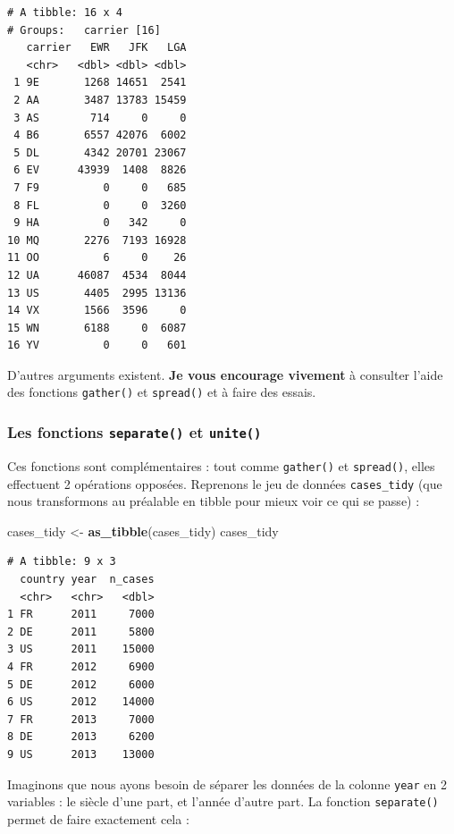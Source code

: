\documentclass[a4paperpaper,]{article}
\newenvironment{Shaded}{\begin{snugshade}}{\end{snugshade}}
\newcommand{\KeywordTok}[1]{\textcolor[rgb]{0.13,0.29,0.53}{\textbf{#1}}}
\newcommand{\StringTok}[1]{\textcolor[rgb]{0.31,0.60,0.02}{#1}}
\newcommand{\NormalTok}[1]{#1}
\theoremstyle{definition}
\theoremstyle{definition}
\theoremstyle{definition}
\theoremstyle{remark}
\begin{document}
\begin{verbatim}
# A tibble: 16 x 4
# Groups:   carrier [16]
   carrier   EWR   JFK   LGA
   <chr>   <dbl> <dbl> <dbl>
 1 9E       1268 14651  2541
 2 AA       3487 13783 15459
 3 AS        714     0     0
 4 B6       6557 42076  6002
 5 DL       4342 20701 23067
 6 EV      43939  1408  8826
 7 F9          0     0   685
 8 FL          0     0  3260
 9 HA          0   342     0
10 MQ       2276  7193 16928
11 OO          6     0    26
12 UA      46087  4534  8044
13 US       4405  2995 13136
14 VX       1566  3596     0
15 WN       6188     0  6087
16 YV          0     0   601
\end{verbatim}

D'autres arguments existent. \textbf{Je vous encourage vivement} à
consulter l'aide des fonctions \texttt{gather()} et \texttt{spread()} et
à faire des essais.

\subsubsection{\texorpdfstring{Les fonctions \texttt{separate()} et
\texttt{unite()}}{Les fonctions separate() et unite()}}\label{les-fonctions-separate-et-unite}

Ces fonctions sont complémentaires : tout comme \texttt{gather()} et
\texttt{spread()}, elles effectuent 2 opérations opposées. Reprenons le
jeu de données \texttt{cases\_tidy} (que nous transformons au préalable
en tibble pour mieux voir ce qui se passe) :

\begin{Shaded}
\begin{Highlighting}[]
\NormalTok{cases_tidy <-}\StringTok{ }\KeywordTok{as_tibble}\NormalTok{(cases_tidy)}
\NormalTok{cases_tidy}
\end{Highlighting}
\end{Shaded}

\begin{verbatim}
# A tibble: 9 x 3
  country year  n_cases
  <chr>   <chr>   <dbl>
1 FR      2011     7000
2 DE      2011     5800
3 US      2011    15000
4 FR      2012     6900
5 DE      2012     6000
6 US      2012    14000
7 FR      2013     7000
8 DE      2013     6200
9 US      2013    13000
\end{verbatim}

Imaginons que nous ayons besoin de séparer les données de la colonne
\texttt{year} en 2 variables : le siècle d'une part, et l'année d'autre
part. La fonction \texttt{separate()} permet de faire exactement cela :
\end{document}
